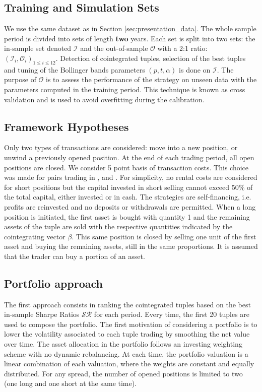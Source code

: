 \documentclass[11pt,a4,twosided,singlespacing,titlepagenumber=on]{scrreprt}
\numberwithin{equation}{chapter} %
\theoremstyle{remark}
\begin{document}
\subsection{Training and Simulation Sets}
We use the same dataset as in Section \ref{sec:presentation_data}. The whole sample period is divided into sets of length \textbf{two} years. Each set is split into two sets: the in-sample set denoted $\mathcal{I}$ and the out-of-sample $\mathcal{O}$ with a 2:1 ratio: $(\mathcal{I}_i, \mathcal{O}_i)_{1 \leq i \leq 12}$. Detection of cointegrated tuples, selection of the best tuples and tuning of the Bollinger bands parameters $(p,t,\alpha)$ is done on $\mathcal{I}$. The purpose of $\mathcal{O}$ is to assess the performance of the strategy on unseen data with the parameters computed in the training period. This technique is known as cross validation and is used to avoid overfitting during the calibration. 


\subsection{Framework Hypotheses}

Only two types of transactions are considered: move into a new position, or unwind a previously opened position. At the end of each trading period, all open positions are closed. We consider 5 point basis of transaction costs. This choice was made for pairs trading in \cite{dunis2010}, \cite{dunis2005} and \cite{alexander2002}. For simplicity, no rental costs are considered for short positions but the capital invested in short selling cannot exceed 50\% of the total capital, either invested or in cash. The strategies are self-financing, i.e. profits are reinvested and no deposits or withdrawals are permitted. When a long position is initiated, the first asset is bought with quantity 1 and the remaining assets of the tuple are sold with the respective quantities indicated by the cointegrating vector $\beta$. This same position is closed by selling one unit of the first asset and buying the remaining assets, still in the same proportions. It is assumed that the trader can buy a portion of an asset.

\subsection{Portfolio approach}

The first approach consists in ranking the cointegrated tuples based on the best in-sample Sharpe Ratios $\mathcal{SR}$ for each period. Every time, the first 20 tuples are used to compose the portfolio. The first motivation of considering a portfolio is to lower the volatility associated to each tuple trading by smoothing the net value over time.  The asset allocation in the portfolio follows an investing weighting scheme with no dynamic rebalancing. At each time, the portfolio valuation is a linear combination of each valuation, where the weights are constant and equally distributed. For any spread, the number of opened positions is limited to two (one long and one short at the same time).
\end{document}
